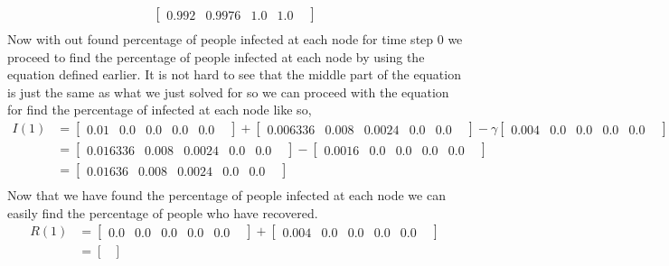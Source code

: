 \documentclass[11pt]{article}
\begin{document}
{\begin{enumerate}
\begin{align*}
\begin{bmatrix}
		0.992    	&
		0.9976 	&
		1.0 		&
		1.0 		&
		\end{bmatrix}\\
\end{align*}
Now with out found percentage of people infected at each node for time step 0 we proceed to find the percentage of people infected at each node by using the equation defined earlier.  It is not hard to see that the middle part of the equation is just the same as what we just solved for so we can proceed with the equation for find the percentage of infected at each node like so,\\
\begin{align*}
	I(1) &=
		\begin{bmatrix} 
		0.01    	&
		0.0    		&
		0.0 		&
		0.0 		&
		0.0 		&
		\end{bmatrix}
		+
		\begin{bmatrix} 
		0.006336    &
		0.008    	&
		0.0024 	&
		0.0 		&
		0.0 		&
		\end{bmatrix}
		- \gamma
		\begin{bmatrix} 
		0.004	&
		0.0    		&
		0.0 		&
		0.0 		&
		0.0 		&
		\end{bmatrix}\\
	      &=
		\begin{bmatrix} 
		0.016336    &
		0.008    	&
		0.0024 	&
		0.0 		&
		0.0 		&
		\end{bmatrix}
		- 
		\begin{bmatrix} 
		0.0016    	&
		0.0    		&
		0.0 		&
		0.0 		&
		0.0 		&
		\end{bmatrix}\\
	      &=
		\begin{bmatrix} 
		0.01636    	&
		0.008  	&
		0.0024	&
		0.0 		&
		0.0 		&
		\end{bmatrix}\\
\end{align*}
Now that we have found the percentage of people infected at each node we can easily find the percentage of people who have recovered.\\
\begin{align*}
	R(1) &=
		\begin{bmatrix} 
		0.0    		&
		0.0    		&
		0.0 		&
		0.0 		&
		0.0 		&
		\end{bmatrix}
		+
		\begin{bmatrix} 
		0.004   	&
		0.0    	&
		0.0	 	&
		0.0 		&
		0.0 		&
		\end{bmatrix}\\
	      &=
		\begin{bmatrix} 

\end{bmatrix}
\end{align*}
\end{enumerate}}
\end{document}
